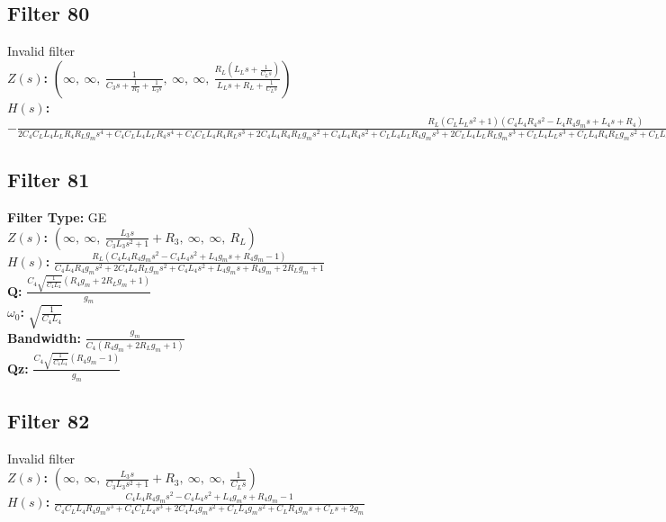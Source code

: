 \documentclass{article}
\begin{document}
\subsection*{Filter 80}
Invalid filter \\ 
\textbf{$Z(s)$:} $\left( \infty, \  \infty, \  \frac{1}{C_{3} s + \frac{1}{R_{3}} + \frac{1}{L_{3} s}}, \  \infty, \  \infty, \  \frac{R_{L} \left(L_{L} s + \frac{1}{C_{L} s}\right)}{L_{L} s + R_{L} + \frac{1}{C_{L} s}}\right)$ \\ 
\textbf{$H(s)$:} $- \frac{R_{L} \left(C_{L} L_{L} s^{2} + 1\right) \left(C_{4} L_{4} R_{4} s^{2} - L_{4} R_{4} g_{m} s + L_{4} s + R_{4}\right)}{2 C_{4} C_{L} L_{4} L_{L} R_{4} R_{L} g_{m} s^{4} + C_{4} C_{L} L_{4} L_{L} R_{4} s^{4} + C_{4} C_{L} L_{4} R_{4} R_{L} s^{3} + 2 C_{4} L_{4} R_{4} R_{L} g_{m} s^{2} + C_{4} L_{4} R_{4} s^{2} + C_{L} L_{4} L_{L} R_{4} g_{m} s^{3} + 2 C_{L} L_{4} L_{L} R_{L} g_{m} s^{3} + C_{L} L_{4} L_{L} s^{3} + C_{L} L_{4} R_{4} R_{L} g_{m} s^{2} + C_{L} L_{4} R_{L} s^{2} + 2 C_{L} L_{L} R_{4} R_{L} g_{m} s^{2} + C_{L} L_{L} R_{4} s^{2} + C_{L} R_{4} R_{L} s + L_{4} R_{4} g_{m} s + 2 L_{4} R_{L} g_{m} s + L_{4} s + 2 R_{4} R_{L} g_{m} + R_{4}}$ \\ 
\subsection*{Filter 81}
\textbf{Filter Type:} GE \\ 
\textbf{$Z(s)$:} $\left( \infty, \  \infty, \  \frac{L_{3} s}{C_{3} L_{3} s^{2} + 1} + R_{3}, \  \infty, \  \infty, \  R_{L}\right)$ \\ 
\textbf{$H(s)$:} $\frac{R_{L} \left(C_{4} L_{4} R_{4} g_{m} s^{2} - C_{4} L_{4} s^{2} + L_{4} g_{m} s + R_{4} g_{m} - 1\right)}{C_{4} L_{4} R_{4} g_{m} s^{2} + 2 C_{4} L_{4} R_{L} g_{m} s^{2} + C_{4} L_{4} s^{2} + L_{4} g_{m} s + R_{4} g_{m} + 2 R_{L} g_{m} + 1}$ \\ 
\textbf{Q:} $\frac{C_{4} \sqrt{\frac{1}{C_{4} L_{4}}} \left(R_{4} g_{m} + 2 R_{L} g_{m} + 1\right)}{g_{m}}$ \\ 
\textbf{$\omega_0$:} $\sqrt{\frac{1}{C_{4} L_{4}}}$ \\ 
\textbf{Bandwidth:} $\frac{g_{m}}{C_{4} \left(R_{4} g_{m} + 2 R_{L} g_{m} + 1\right)}$ \\ 
\textbf{Qz:} $\frac{C_{4} \sqrt{\frac{1}{C_{4} L_{4}}} \left(R_{4} g_{m} - 1\right)}{g_{m}}$ \\ 
\subsection*{Filter 82}
Invalid filter \\ 
\textbf{$Z(s)$:} $\left( \infty, \  \infty, \  \frac{L_{3} s}{C_{3} L_{3} s^{2} + 1} + R_{3}, \  \infty, \  \infty, \  \frac{1}{C_{L} s}\right)$ \\ 
\textbf{$H(s)$:} $\frac{C_{4} L_{4} R_{4} g_{m} s^{2} - C_{4} L_{4} s^{2} + L_{4} g_{m} s + R_{4} g_{m} - 1}{C_{4} C_{L} L_{4} R_{4} g_{m} s^{3} + C_{4} C_{L} L_{4} s^{3} + 2 C_{4} L_{4} g_{m} s^{2} + C_{L} L_{4} g_{m} s^{2} + C_{L} R_{4} g_{m} s + C_{L} s + 2 g_{m}}$ \\ 
\end{document}
